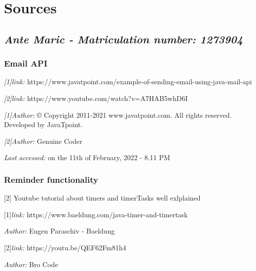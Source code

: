 \chapter{\centering Sources}


\section{\emph{Ante Maric - Matriculation number: 1273904}}

\subsection{Email API}

\emph{[1]link:} https://www.javatpoint.com/example-of-sending-email-using-java-mail-api 

\emph{[2]link:} https://www.youtube.com/watch?v=A7HAB5whD6I
\newline

\emph{[1]Author:} © Copyright 2011-2021 www.javatpoint.com. All rights reserved. Developed by JavaTpoint.

\emph{[2]Author:} Genuine Coder

\emph{Last accessed:} on the 11th of February, 2022 - 8.11 PM

\subsection{Reminder functionality}
[2] Youtube tutorial about timers and timerTasks well exlplained\newline

[1]\emph{link:} https://www.baeldung.com/java-timer-and-timertask 

\emph{Author:} Eugen Paraschiv - Baeldung\newline

[2]\emph{link:} https://youtu.be/QEF62Fm81h4 

\emph{Author:} Bro Code\newline

